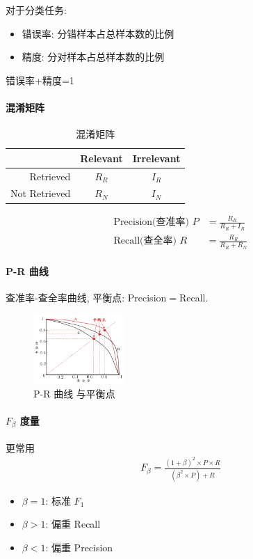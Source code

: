 对于分类任务:
\begin{itemize}
    \item 错误率: 分错样本占总样本数的比例
    \item 精度: 分对样本占总样本数的比例
\end{itemize}
错误率+精度=1

\paragraph{混淆矩阵}\quad

\begin{table}[!htb]
    \centering
    \caption{混淆矩阵}
    \begin{tabular}[c]{|r|c|c|}\hline
        & Relevant & Irrelevant\\ \hline
        Retrieved & $R_R$ & $I_R$\\ \hline
        Not Retrieved & $R_N$ & $I_N$ \\  \hline
    \end{tabular}
\end{table}
\begin{align*}
    \text{Precision(查准率) }P&=\frac{R_R}{R_R+I_R}\\
    \text{Recall(查全率) }R&=\frac{R_R}{R_R+R_N}
\end{align*}

\paragraph{P-R 曲线}查准率-查全率曲线, 平衡点: Precision$=$Recall. 
\begin{figure}[H]
    \centering
    \includegraphics[width=0.309\textwidth]{pic/ML2/P-R 曲线 与平衡点.png}
    \caption{P-R 曲线 与平衡点}
\end{figure}

\paragraph{\texorpdfstring{$F_\beta$}. 度量} 更常用
\begin{align*}
    F_\beta=\frac{(1+\beta)^2\times P \times R}{(\beta^2 \times P)+R}
\end{align*}
\begin{itemize}
    \item $\beta=1$: 标准 $F_1$
    \item $\beta>1$: 偏重 Recall
    \item $\beta<1$: 偏重 Precision
\end{itemize}

